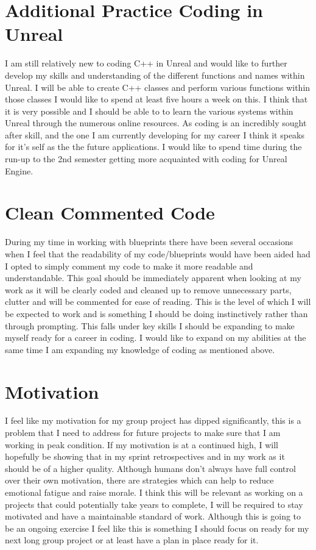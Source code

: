 \documentclass{scrartcl}
\begin{document}
\section{Additional Practice Coding in Unreal}

I am still relatively new to coding C++ in Unreal and would like to further develop my skills and understanding of the different functions and names within Unreal. I will be able to create C++ classes and perform various functions within those classes I would like to spend at least five hours a week on this. I think that it is very possible and I should be able to to learn the various systems within Unreal through the numerous online resources. As coding is an incredibly sought after skill, and the one I am currently developing for my career I think it speaks for it's self as the the future applications. I would like to spend time during the run-up to the 2nd semester getting more acquainted with coding for Unreal Engine. 



\section{Clean Commented Code}

During my time in working with blueprints there have been several occasions when I feel that the readability of my code/blueprints would have been aided had I opted to simply comment my code to make it more readable and understandable. This goal should be immediately apparent when looking at my work as it will be clearly coded and cleaned up to remove unnecessary parts, clutter and will be commented for ease of reading. This is the level of which I will be expected to work and is something I should be doing instinctively rather than through prompting. This falls under key skills I should be expanding to make myself ready for a career in coding. I would like to expand on my abilities at the same time I am expanding my knowledge of coding as mentioned above.


\section{Motivation}

I feel like my motivation for my group project has dipped significantly, this is a problem that I need to address for future projects to make sure that I am working in peak condition. If my motivation is at a continued high, I will hopefully be showing that in my sprint retrospectives and in my work as it should be of a higher quality. Although humans don't always have full control over their own motivation, there are strategies which can help to reduce emotional fatigue and raise morale. I think this will be relevant as working on a projects that could potentially take years to complete, I will be required to stay motivated and have a maintainable standard of work. Although this is going to be an ongoing exercise I feel like this is something I should focus on ready for my next long group project or at least have a plan in place ready for it. 
\end{document}
